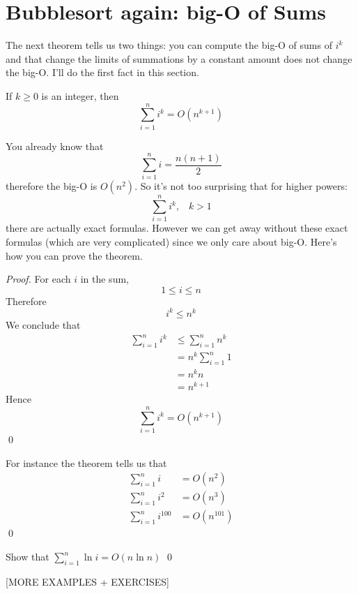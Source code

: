\section{Bubblesort again: big-O of Sums}

The next theorem tells us two things:
you can compute the big-O of sums of $i^k$ and 
that change the limits of summations by a constant amount
does not change the big-O.
I'll do the first fact in this section.

\begin{thm} 
If $k \geq 0$ is an integer, then
\[ \sum_{i=1}^{n} i^k = O(n^{k+1}) \]
\end{thm}

You already know that
\[ \sum_{i=1}^{n} i = \frac{n(n+1)}{2} \]
therefore the big-O is $O(n^2)$.
So it's not too surprising that for higher powers:
\[ \sum_{i=1}^{n} i^k, \,\,\,\,\, k > 1 \]
there are actually exact formulas.
However we can get away without these exact formulas 
(which are very complicated) since we only care
about big-O.
Here's how you can prove the theorem.


\textit{Proof.}
For each $i$ in the sum, 
\[
1 \leq i \leq n
\]
Therefore
\[
i^k \leq n^k
\]
We conclude that
\begin{align*}
\sum_{i=1}^n i^k 
&\leq \sum_{i=1}^n n^k \\
&= n^k \sum_{i=1}^n 1 \\
&= n^kn \\
&= n^{k+1}
\end{align*}
Hence
\[
\sum_{i=1}^n i^k = O(n^{k+1})
\]
\qed


\begin{eg}
For instance the theorem tells us that 
\begin{align*}
\sum_{i = 1}^{n} i &= O(n^2) \\
\sum_{i = 1}^{n} i^{2} &= O(n^3) \\
\sum_{i = 1}^{n} i^{100} &= O(n^{101})
\end{align*}
\qed
\end{eg}


\begin{ex} Show that
$\sum_{i = 1}^n \ln i = O(n \ln n)$
\qed
\end{ex}

[MORE EXAMPLES + EXERCISES]
